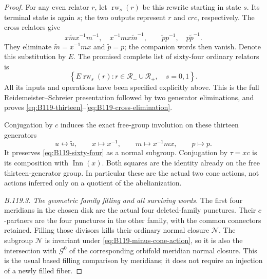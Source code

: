 \begin{proof}
For any even relator $r$, let $\operatorname{rw}_s(r)$ be this
rewrite starting in state $s$. Its terminal state is again $s$;
the two outputs represent $r$ and $crc$, respectively. The cross
relators give
\[
 x\widetilde m x^{-1}m^{-1},\quad
 x^{-1}mx\widetilde m^{-1},\qquad
 \widetilde p p^{-1},\quad p\widetilde p^{-1}.
\]
They eliminate $\widetilde m=x^{-1}mx$ and $\widetilde p=p$;
the companion words then vanish. Denote this substitution by $E$.
The promised complete list of sixty-four ordinary relators is
\begin{equation}\label{eq:B119-sixty-four}
 \left\{E\operatorname{rw}_s(r):
       r\in\mathscr R_-\cup\mathscr R_+,\quad s=0,1\right\}.
\end{equation}
All its inputs and operations have been specified explicitly above.
This is the full Reidemeister--Schreier presentation followed by
two generator eliminations, and proves
\eqref{eq:B119-thirteen}--\eqref{eq:B119-cross-elimination}.

Conjugation by $c$ induces the exact free-group involution on these
thirteen generators
\begin{equation}\label{eq:B119-minus-cone-action}
 u\longleftrightarrow\widetilde u,\qquad x\longmapsto x^{-1},
 \qquad m\longmapsto x^{-1}mx,\qquad p\longmapsto p.
\end{equation}
It preserves \eqref{eq:B119-sixty-four} as a normal subgroup.
Conjugation by $\tau=xc$ is its composition with
$\operatorname{Inn}(x)$. Both squares are the identity already
on the free thirteen-generator group. In particular these are
the actual two cone actions, not actions inferred only on a quotient
of the abelianization.

\emph{B.119.3. The geometric family filling and all surviving words.}
The first four meridians in the chosen disk are the actual four
deleted-family punctures. Their $c$-partners are the four punctures
in the other family, with the common connectors retained. Filling
those divisors kills their ordinary normal closure $\mathcal N$.
The subgroup $\mathcal N$ is invariant under
\eqref{eq:B119-minus-cone-action}, so it is also the intersection
with $\mathcal G^0$ of the corresponding orbifold meridian normal
closure. This is the usual based filling comparison by meridians;
it does not require an injection of a newly filled fiber.


\end{proof}
